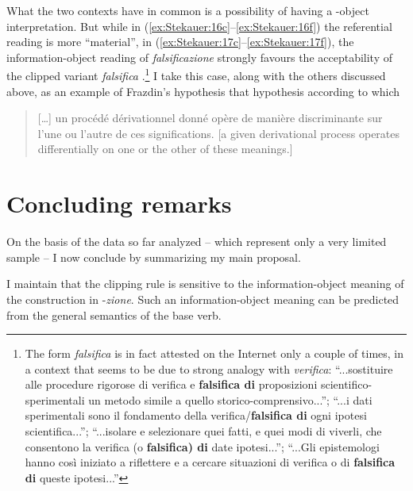 \documentclass[output=paper]{langsci/langscibook}
\begin{document}
What the two contexts have in common is a possibility of having a
-object interpretation. But while in (\ref{ex:Stekauer:16c}--\ref{ex:Stekauer:16f}) the
referential reading is more ``material'', in (\ref{ex:Stekauer:17c}--\ref{ex:Stekauer:17f}), the
information-object reading of \emph{falsificazione} strongly favours the
acceptability of the clipped variant \emph{falsifica} %
\citep[see also][196, note 16 on \emph{falsifica}]{MonterminiThornton2014}%
%
.\footnote{The
  form \emph{falsifica} is in fact attested on the Internet only a
  couple of times, in a context that seems to be due to strong analogy
  with \emph{verifica}: ``...sostituire alle procedure rigorose di
  verifica e \textbf{falsifica di} proposizioni scientifico-sperimentali
  un metodo simile a quello storico-comprensivo...''; ``...i dati
  sperimentali sono il fondamento della verifica/\textbf{falsifica di}
  ogni ipotesi scientifica...''; ``...isolare e selezionare quei fatti,
  e quei modi di viverli, che consentono la verifica (o
  \textbf{falsifica) di} date ipotesi...''; ``...Gli epistemologi hanno
  così iniziato a riflettere e a cercare situazioni di verifica o di
  \textbf{falsifica di} queste ipotesi...''}
I take this case, along with the others discussed above, as an example
of Frazdin's hypothesis that  %
%
hypothesis according to which

\begin{quote}

[\ldots] un procédé dérivationnel donné opère de manière discriminante sur
l'une ou l'autre de ces significations. {[}a given derivational process
operates differentially on one or the other of these
meanings.{]} \citep[86]{Fradin09}
\end{quote}

\section{Concluding remarks}\label{Stekauer-concluding-remarks}

On the basis of the data so far analyzed -- which represent only a very
limited sample -- I now conclude by summarizing my main proposal.

I maintain that the clipping rule is sensitive to the information-object
meaning of the construction in -\emph{zione}. Such an information-object
meaning can be predicted from the general semantics of the base verb.
\end{document}
